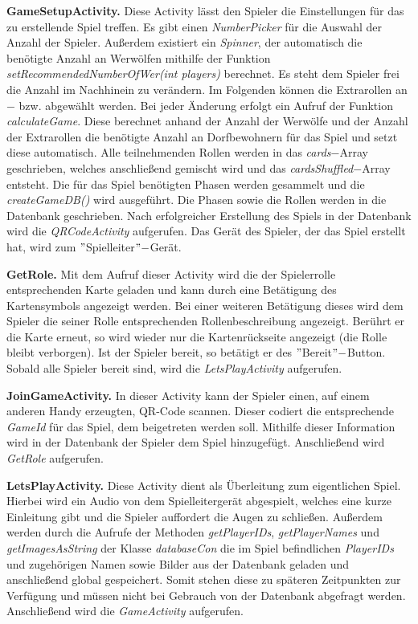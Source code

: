 \documentclass[12pt, a4paper]{article}
\begin{document}
\textbf{GameSetupActivity.}
Diese Activity lässt den Spieler die Einstellungen für das zu erstellende Spiel treffen.
Es gibt einen \textit{NumberPicker} für die Auswahl der Anzahl der Spieler.
Außerdem existiert ein \textit{Spinner}, der automatisch die benötigte Anzahl an Werwölfen mithilfe der Funktion \textit{setRecommendedNumberOfWer(int players)} berechnet. Es steht dem Spieler frei die Anzahl im Nachhinein zu verändern.
Im Folgenden können die Extrarollen an$-$ bzw. abgewählt werden.
Bei jeder Änderung erfolgt ein Aufruf der Funktion \textit{calculateGame}. Diese berechnet anhand der Anzahl der Werwölfe und der Anzahl der Extrarollen die benötigte Anzahl an Dorfbewohnern für das Spiel und setzt diese automatisch.
Alle teilnehmenden Rollen werden in das \textit{cards}$-$Array geschrieben, welches anschließend gemischt wird
und das \textit{cardsShuffled}$-$Array entsteht.
Die für das Spiel benötigten Phasen werden gesammelt und die \textit{createGameDB()} wird ausgeführt.
Die Phasen sowie die Rollen werden in die Datenbank geschrieben.
Nach erfolgreicher Erstellung des Spiels in der Datenbank wird die \textit{QRCodeActivity} aufgerufen. Das Gerät des Spieler, der das Spiel erstellt hat, wird zum $"$Spielleiter$"-$Gerät.
\vspace{0,3 cm}  

\textbf{GetRole.}
Mit dem Aufruf dieser Activity wird die der Spielerrolle entsprechenden Karte geladen und kann durch eine Betätigung des Kartensymbols angezeigt werden. Bei einer weiteren Betätigung dieses wird dem Spieler die seiner Rolle entsprechenden Rollenbeschreibung angezeigt. Berührt er die Karte erneut, so wird wieder nur die Kartenrückseite angezeigt (die Rolle bleibt verborgen). Ist der Spieler bereit, so betätigt er des $"$Bereit$"-$Button. Sobald alle Spieler bereit sind, wird die \textit{LetsPlayActivity} aufgerufen.

\vspace{0,3 cm}      
      
\textbf{JoinGameActivity.}
In dieser Activity kann der Spieler einen, auf einem anderen Handy erzeugten, QR-Code scannen.
Dieser codiert die entsprechende \textit{GameId} für das Spiel, dem beigetreten werden soll.
Mithilfe dieser Information wird in der Datenbank der Spieler dem Spiel hinzugefügt.
Anschließend wird \textit{GetRole} aufgerufen.

\vspace{0,3 cm}
      
\textbf{LetsPlayActivity.}
Diese Activity dient als Überleitung zum eigentlichen Spiel. Hierbei wird ein Audio von dem Spielleitergerät abgespielt, welches eine kurze Einleitung gibt und die Spieler auffordert die Augen zu schließen. Außerdem werden durch die Aufrufe der Methoden \textit{getPlayerIDs}, \textit{getPlayerNames} und \textit{getImagesAsString} der Klasse \textit{databaseCon} die im Spiel befindlichen \textit{PlayerIDs} und zugehörigen Namen sowie Bilder aus der Datenbank geladen und anschließend global gespeichert. Somit stehen diese zu späteren Zeitpunkten zur Verfügung und müssen nicht bei Gebrauch von der Datenbank abgefragt werden. 
Anschließend wird die \textit{GameActivity} aufgerufen.
\end{document}
